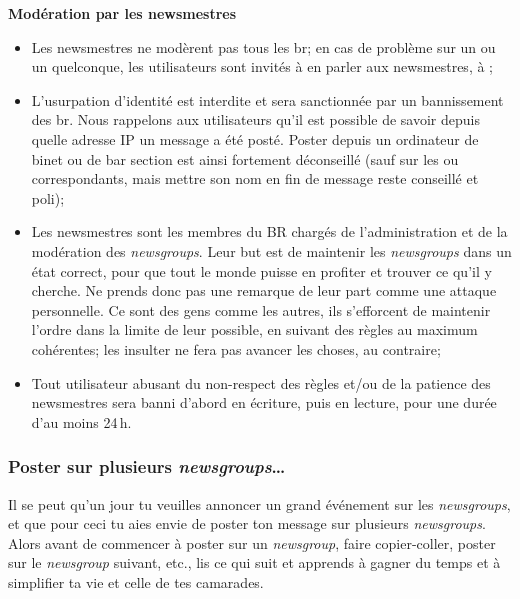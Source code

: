 \textbf{Modération par les newsmestres}
\begin{itemize}
 \item Les newsmestres ne modèrent pas tous les br; en cas de problème sur un  ou un  quelconque, les utilisateurs sont invités à en parler aux newsmestres, à ;
 \item L'usurpation d'identité est interdite et sera sanctionnée par un bannissement des br. Nous rappelons aux utilisateurs qu'il est possible de savoir depuis quelle adresse IP un message a été posté. Poster depuis un ordinateur de binet ou de bar section est ainsi fortement déconseillé (sauf sur les  ou  correspondants, mais mettre son nom en fin de message reste conseillé et poli);
 \item Les newsmestres sont les membres du BR chargés de l'administration et de la modération des \emph{newsgroups}. Leur but est de maintenir les \emph{newsgroups} dans un état correct, pour que tout le monde puisse en profiter et trouver ce qu'il y cherche. Ne prends donc pas une remarque de leur part comme une attaque personnelle. Ce sont des gens comme les autres, ils s'efforcent de maintenir l'ordre dans la limite de leur possible, en suivant des règles au maximum cohérentes; les insulter ne fera pas avancer les choses, au contraire;
 \item Tout utilisateur abusant du non-respect des règles et/ou de la patience des newsmestres sera banni d'abord en écriture, puis en lecture, pour une durée d'au moins 24\,h.
\end{itemize}



\subsubsection{Poster sur plusieurs \emph{newsgroups}\dots }



Il se peut qu'un jour tu veuilles annoncer un grand événement sur les \emph{newsgroups}, et que pour ceci tu aies envie de poster ton message sur
plusieurs \emph{newsgroups}. Alors avant de commencer à poster sur un \emph{newsgroup}, faire copier-coller, poster sur le \emph{newsgroup} suivant,
etc., lis ce qui suit et apprends à gagner du temps et à simplifier ta vie et celle de tes camarades.

